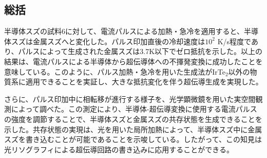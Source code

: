 \subsection{総括}
半導体スズの試料6に対して、電流パルスによる加熱・急冷を適用すると、半導体スズは金属スズへと変化した。パルス印加直後の冷却速度は$10^2$ K/s程度であり、パルスによって生成された金属スズは3.7K以下でゼロ抵抗を示した。以上の結果は、電流パルスによる半導体から超伝導体への不揮発変換に成功したことを意味している。このように、パルス加熱・急冷を用いた生成法がIrTe$_2$以外の物質系に適用できることを実証し、大きな抵抗変化を伴う超伝導生成を実現した。

さらに、パルス印加中に相転移が進行する様子を、光学顕微鏡を用いた実空間観測によって調べた。この測定により、半導体-超伝導変換に使用する電流パルスの強度を調節することで、半導体スズと金属スズの共存状態を生成できることを示した。共存状態の実現は、光を用いた局所加熱によって、半導体スズ中に金属スズを書き込むことが可能であることを示唆している。したがって、この知見は光リソグラフィによる超伝導回路の書き込みに応用することができる。


\clearpage


